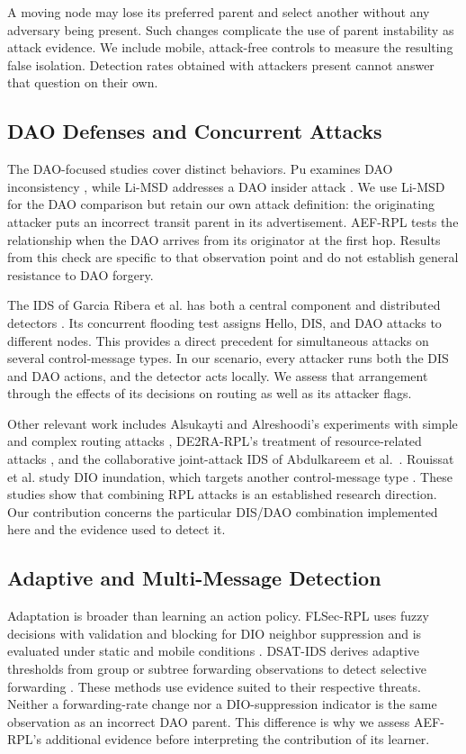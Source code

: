 \documentclass[journal]{IEEEtran}
\begin{document}
A moving node may lose its preferred parent and select another without any adversary being present. Such changes complicate the use of parent instability as attack evidence. We include mobile, attack-free controls to measure the resulting false isolation. Detection rates obtained with attackers present cannot answer that question on their own.

\subsection{DAO Defenses and Concurrent Attacks}
The DAO-focused studies cover distinct behaviors. Pu examines DAO inconsistency \cite{pu2018}, while Li-MSD addresses a DAO insider attack \cite{limsd2024}. We use Li-MSD for the DAO comparison but retain our own attack definition: the originating attacker puts an incorrect transit parent in its advertisement. AEF-RPL tests the relationship when the DAO arrives from its originator at the first hop. Results from this check are specific to that observation point and do not establish general resistance to DAO forgery.

The IDS of Garcia Ribera et al. has both a central component and distributed detectors \cite{garciaribera2022}. Its concurrent flooding test assigns Hello, DIS, and DAO attacks to different nodes. This provides a direct precedent for simultaneous attacks on several control-message types. In our scenario, every attacker runs both the DIS and DAO actions, and the detector acts locally. We assess that arrangement through the effects of its decisions on routing as well as its attacker flags.

Other relevant work includes Alsukayti and Alreshoodi's experiments with simple and complex routing attacks \cite{alsukayti2023}, DE2RA-RPL's treatment of resource-related attacks \cite{de2rarpl2024}, and the collaborative joint-attack IDS of Abdulkareem et al.\ \cite{abdulkareem2024}. Rouissat et al. study DIO inundation, which targets another control-message type \cite{rouissat2023}. These studies show that combining RPL attacks is an established research direction. Our contribution concerns the particular DIS/DAO combination implemented here and the evidence used to detect it.

\subsection{Adaptive and Multi-Message Detection}
Adaptation is broader than learning an action policy. FLSec-RPL uses fuzzy decisions with validation and blocking for DIO neighbor suppression and is evaluated under static and mobile conditions \cite{flsecrpl2024}. DSAT-IDS derives adaptive thresholds from group or subtree forwarding observations to detect selective forwarding \cite{dsatids2024}. These methods use evidence suited to their respective threats. Neither a forwarding-rate change nor a DIO-suppression indicator is the same observation as an incorrect DAO parent. This difference is why we assess AEF-RPL's additional evidence before interpreting the contribution of its learner.
\end{document}
